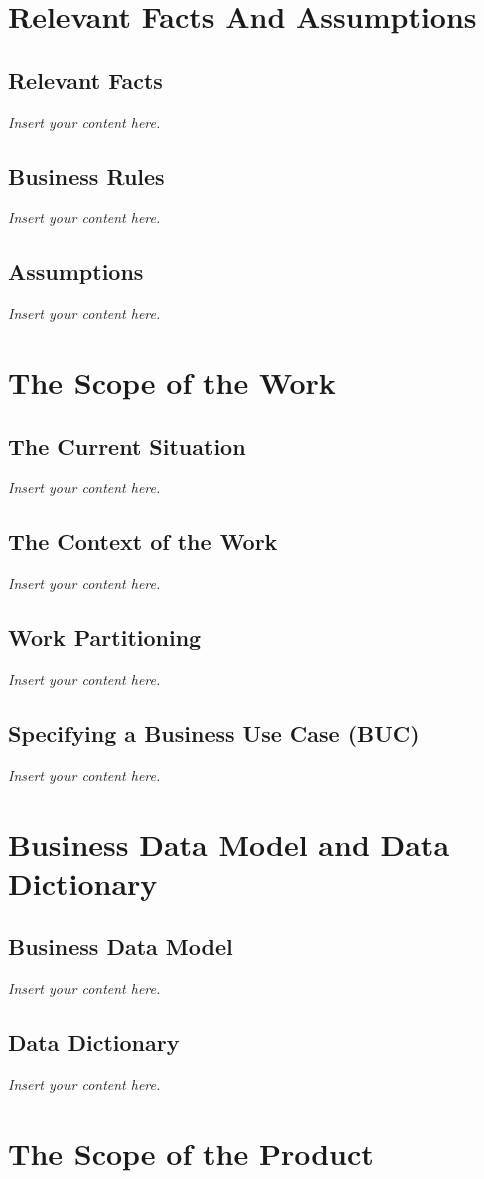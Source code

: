 \documentclass[12pt]{article}
\newcommand{\lips}{\textit{Insert your content here.}}
\begin{document}
\section{Relevant Facts And Assumptions}
\subsection{Relevant Facts}
\lips
\subsection{Business Rules}
\lips
\subsection{Assumptions}
\lips

\section{The Scope of the Work}
\subsection{The Current Situation}
\lips
\subsection{The Context of the Work}
\lips
\subsection{Work Partitioning}
\lips
\subsection{Specifying a Business Use Case (BUC)}
\lips

\section{Business Data Model and Data Dictionary}
\subsection{Business Data Model}
\lips
\subsection{Data Dictionary}
\lips

\section{The Scope of the Product}
\end{document}

